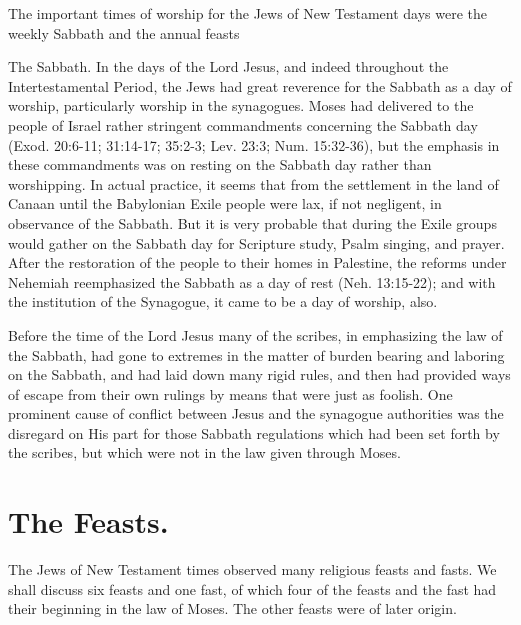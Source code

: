 The important times of worship for the Jews of New Testament days were the weekly Sabbath and the annual feasts

The Sabbath. In the days of the Lord Jesus, and indeed throughout the Intertestamental Period, the Jews had great reverence for the Sabbath as a day of worship, particularly worship in the synagogues. Moses had delivered to the people of Israel rather stringent commandments concerning the Sabbath day (Exod. 20:6-11; 31:14-17; 35:2-3; Lev. 23:3; Num. 15:32-36), but the emphasis in these commandments was on resting on the Sabbath day rather than worshipping. In actual practice, it seems that from the settlement in the land of Canaan until the Babylonian Exile people were lax, if not negligent, in observance of the Sabbath. But it is very probable that during the Exile groups would gather on the Sabbath day for Scripture study, Psalm singing, and prayer. After the restoration of the people to their homes in Palestine, the reforms under Nehemiah reemphasized the Sabbath as a day of rest (Neh. 13:15-22); and with the institution of the Synagogue, it came to be a day of worship, also.

Before the time of the Lord Jesus many of the scribes, in emphasizing the law of the Sabbath, had gone to extremes in the matter of burden bearing and laboring on the Sabbath, and had laid down many rigid rules, and then had provided ways of escape from their own rulings by means that were just as foolish. One prominent cause of conflict between Jesus and the synagogue authorities was the disregard on His part for those Sabbath regulations which had been set forth by the scribes, but which were not in the law given through Moses.

\section{The Feasts.}

The Jews of New Testament times observed many religious feasts and fasts. We shall discuss six feasts and one fast, of which four of the feasts and the fast had their beginning in the law of Moses. The other feasts were of later origin.

